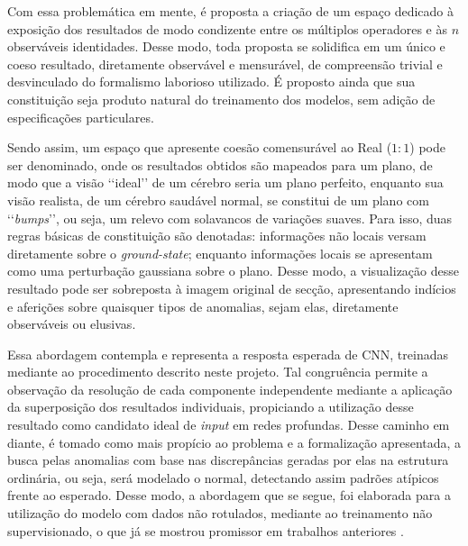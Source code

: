 \documentclass[a4paper, 12pt]{report}
\begin{document}
Com essa problemática em mente, é proposta a criação de um espaço dedicado à exposição dos resultados de modo condizente entre os múltiplos operadores e às $n$ observáveis identidades. Desse modo, toda proposta se solidifica em um único e coeso resultado, diretamente observável e mensurável, de compreensão trivial e desvinculado do formalismo laborioso utilizado. É proposto ainda que sua constituição seja produto natural do treinamento dos modelos, sem adição de especificações particulares.

Sendo assim, um espaço que apresente coesão comensurável ao Real ($1:1$) pode ser denominado, onde os resultados obtidos são mapeados para um plano, de modo que a visão {\lq\lq}ideal{\rq\rq} de um cérebro seria um plano perfeito, enquanto sua visão realista, de um cérebro saudável normal, se constitui de um plano com {\lq\lq}\textit{bumps}{\rq\rq}, ou seja, um relevo com solavancos de variações suaves. Para isso, duas regras básicas de constituição são denotadas: informações não locais versam diretamente sobre o \textit{ground-state}; enquanto informações locais se apresentam como uma perturbação gaussiana sobre o plano. Desse modo, a visualização desse resultado pode ser sobreposta à imagem original de secção, apresentando indícios e aferições sobre quaisquer tipos de anomalias, sejam elas, diretamente observáveis ou elusivas.     

Essa abordagem contempla e representa a resposta esperada de CNN, treinadas mediante ao procedimento descrito neste projeto. Tal congruência permite a observação da resolução de cada componente independente mediante a aplicação da superposição dos resultados individuais, propiciando a utilização desse resultado como candidato ideal de \textit{input} em redes profundas. Desse caminho em diante, é tomado como mais propício ao problema e a formalização apresentada, a busca pelas anomalias com base nas discrepâncias geradas por elas na estrutura ordinária, ou seja, será modelado o normal, detectando assim padrões atípicos frente ao esperado. Desse modo, a abordagem que se segue, foi elaborada para a utilização do modelo com dados não rotulados, mediante ao treinamento não supervisionado, o que já se mostrou promissor em trabalhos anteriores \cite{Mane2024,Nakao2021,Baur2021}.
\end{document}
